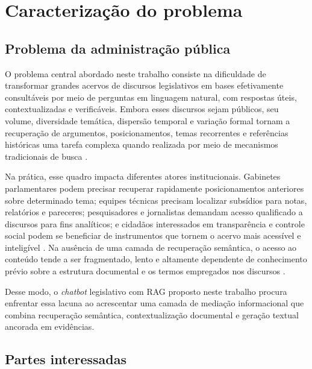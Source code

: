 \section{Caracterização do problema}

\subsection{Problema da administração pública}

O problema central abordado neste trabalho consiste na dificuldade de transformar grandes acervos de discursos legislativos em bases efetivamente consultáveis por meio de perguntas em linguagem natural, com respostas úteis, contextualizadas e verificáveis. Embora esses discursos sejam públicos, seu volume, diversidade temática, dispersão temporal e variação formal tornam a recuperação de argumentos, posicionamentos, temas recorrentes e referências históricas uma tarefa complexa quando realizada por meio de mecanismos tradicionais de busca \parencite{kavcic2024historicalViewer,blanco2025plenarioPalanqueEstudio,blanco2026letrasGraudas}.

Na prática, esse quadro impacta diferentes atores institucionais. Gabinetes parlamentares podem precisar recuperar rapidamente posicionamentos anteriores sobre determinado tema; equipes técnicas precisam localizar subsídios para notas, relatórios e pareceres; pesquisadores e jornalistas demandam acesso qualificado a discursos para fins analíticos; e cidadãos interessados em transparência e controle social podem se beneficiar de instrumentos que tornem o acervo mais acessível e inteligível \parencite{bandeiraBernardes2016information}. Na ausência de uma camada de recuperação semântica, o acesso ao conteúdo tende a ser fragmentado, lento e altamente dependente de conhecimento prévio sobre a estrutura documental e os termos empregados nos discursos \parencite{gao2023ragSurvey,martelloteViola2025organizacaoConhecimento,geunis2023parliamentaryMonitoring}.

Desse modo, o \textit{chatbot} legislativo com RAG proposto neste trabalho procura enfrentar essa lacuna ao acrescentar uma camada de mediação informacional que combina recuperação semântica, contextualização documental e geração textual ancorada em evidências.

\subsection{Partes interessadas}

